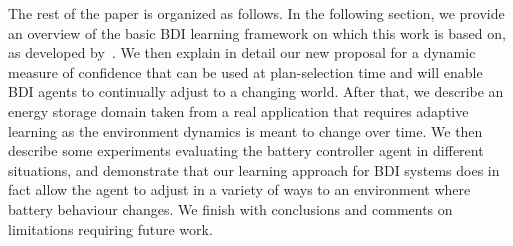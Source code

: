 The rest of the paper is organized as follows.
In the following section, we provide an overview of the basic BDI learning framework on which this work is based on, as developed by~\cite{airiau09:enhancing,singh10:extending,singh10:learning}. 
We then explain in detail our new proposal for a dynamic measure of confidence that can be used at plan-selection time and will enable BDI agents to continually adjust to a changing world. 
After that, we describe an energy storage domain taken from a real application that requires adaptive learning as the environment dynamics is meant to change over time. We then describe some experiments evaluating the battery controller agent in different situations, and demonstrate that our learning approach for BDI systems does in fact allow the agent to adjust in a variety of ways to an environment where battery behaviour changes. 
We finish with conclusions and comments on limitations requiring future work.
